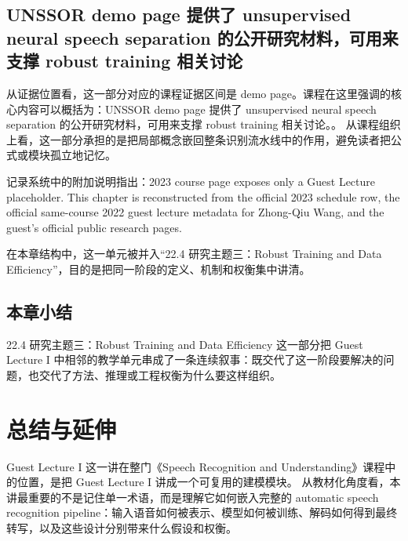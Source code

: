 \documentclass[a4paper]{article}
\begin{document}
\subsection{UNSSOR demo page 提供了 unsupervised neural speech separation 的公开研究材料，可用来支撑 robust training 相关讨论}
从证据位置看，这一部分对应的课程证据区间是 demo page。课程在这里强调的核心内容可以概括为：UNSSOR demo page 提供了 unsupervised neural speech separation 的公开研究材料，可用来支撑 robust training 相关讨论。。
从课程组织上看，这一部分承担的是把局部概念嵌回整条识别流水线中的作用，避免读者把公式或模块孤立地记忆。

记录系统中的附加说明指出：2023 course page exposes only a Guest Lecture placeholder. This chapter is reconstructed from the official 2023 schedule row, the official same-course 2022 guest lecture metadata for Zhong-Qiu Wang, and the guest's official public research pages.

在本章结构中，这一单元被并入“22.4 研究主题三：Robust Training and Data Efficiency”，目的是把同一阶段的定义、机制和权衡集中讲清。

\subsection{本章小结}
22.4 研究主题三：Robust Training and Data Efficiency 这一部分把 Guest Lecture I 中相邻的教学单元串成了一条连续叙事：既交代了这一阶段要解决的问题，也交代了方法、推理或工程权衡为什么要这样组织。

\section{总结与延伸}
Guest Lecture I 这一讲在整门《Speech Recognition and Understanding》课程中的位置，是把 Guest Lecture I 讲成一个可复用的建模模块。
从教材化角度看，本讲最重要的不是记住单一术语，而是理解它如何嵌入完整的 automatic speech recognition pipeline：输入语音如何被表示、模型如何被训练、解码如何得到最终转写，以及这些设计分别带来什么假设和权衡。
\end{document}
